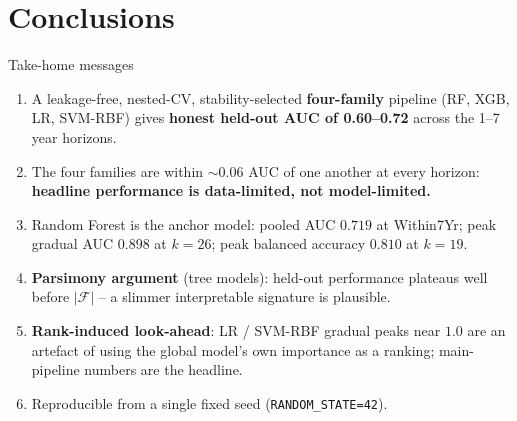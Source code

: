 \documentclass[10pt,aspectratio=169]{beamer}
\begin{document}
\section{Conclusions}

\begin{frame}{Take-home messages}
  \begin{enumerate}
    \item A leakage-free, nested-CV, stability-selected \textbf{four-family}
          pipeline (RF, XGB, LR, SVM-RBF) gives \textbf{honest held-out
          AUC of 0.60--0.72} across the 1--7 year horizons.
    \item The four families are within $\sim 0.06$ AUC of one another at
          every horizon: \textbf{headline performance is data-limited,
          not model-limited.}
    \item Random Forest is the anchor model: pooled AUC $0.719$ at
          Within7Yr; peak gradual AUC $0.898$ at $k=26$;
          peak balanced accuracy $0.810$ at $k=19$.
    \item \textbf{Parsimony argument} (tree models): held-out
          performance plateaus well before $|\mathcal{F}|$ -- a slimmer
          interpretable signature is plausible.
    \item \textbf{Rank-induced look-ahead}: LR / SVM-RBF gradual peaks
          near $1.0$ are an artefact of using the global model's own
          importance as a ranking; main-pipeline numbers are the
          headline.
    \item Reproducible from a single fixed seed (\texttt{RANDOM\_STATE=42}).
  \end{enumerate}
\end{frame}
\end{document}
